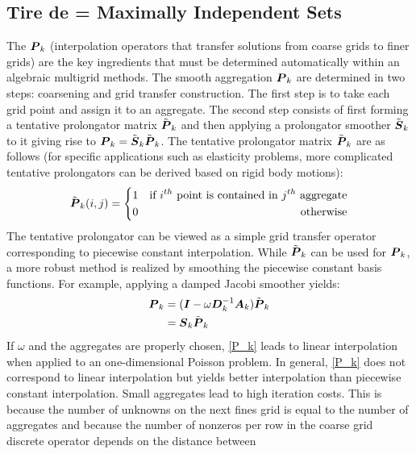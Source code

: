 \subsection{Tire de \cite{mis} = Maximally Independent Sets}
The $\boldsymbol{P}_k$ (interpolation operators that transfer solutions from coarse
grids to finer grids) are the key ingredients that must be determined
automatically within an algebraic multigrid methods. The smooth aggregation
$\boldsymbol{P}_k$ are determined in two steps: coarsening and grid transfer
construction. The first step is to take each grid point and assign it to an
aggregate. The second step consists of first forming a tentative prolongator
matrix $\tilde{\boldsymbol{P}}_k$ and then applying a prolongator smoother
$\tilde{\boldsymbol{S}}_k$ to it giving rise to $\boldsymbol{P}_k =
\tilde{\boldsymbol{S}}_k\tilde{\boldsymbol{P}}_k$. The tentative prolongator matrix
$\tilde{\boldsymbol{P}}_k$ are as follows (for specific applications such as
elasticity problems, more complicated tentative prolongators can be derived
based on rigid body motions):
\begin{equation}
\tilde{\boldsymbol{P}}_k(i,j) = \left\{
\begin{aligned}
&1 &\textrm{if }i^{th}\textrm{ point is contained in }j^{th}\textrm{
  aggregate}\\
& 0 &\textrm{otherwise}
\end{aligned}
\right.
\end{equation}
The tentative prolongator can be viewed as a simple grid transfer operator
corresponding to piecewise constant interpolation. While $\tilde{\boldsymbol{P}}_k$
can be used for $\boldsymbol{P}_k$, a more robust method is realized by smoothing the
piecewise constant basis functions. For example, applying a damped Jacobi
smoother yields:
\begin{equation}
\begin{split}
\boldsymbol{P}_k &= (\boldsymbol{I}-\omega \boldsymbol{D}_k^{-1} \boldsymbol{A}_k) \tilde{\boldsymbol{P}}_k \\
&= \boldsymbol{S}_k \tilde{\boldsymbol{P}}_k
\end{split}
\label{P_k}
\end{equation}
If $\omega$ and the aggregates are properly chosen, \cref{P_k} leads to linear
interpolation when applied to an one-dimensional Poisson problem. In general,
\cref{P_k} does not correspond to linear interpolation but yields better
interpolation than piecewise constant interpolation. Small aggregates lead to
high iteration costs. This is because the number of unknowns on the next fines
grid is equal to the number of aggregates and because the number of nonzeros
per row in the coarse grid discrete operator depends on the distance between
